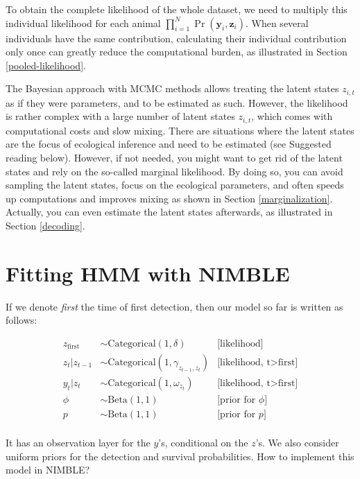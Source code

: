 \documentclass[
  12pt,
]{krantz}
\begin{document}
To obtain the complete likelihood of the whole dataset, we need to multiply this individual likelihood for each animal \(\displaystyle{\prod_{i=1}^N{\Pr(\mathbf{y}_i,\mathbf{z}_i)}}\). When several individuals have the same contribution, calculating their individual contribution only once can greatly reduce the computational burden, as illustrated in Section \ref{pooled-likelihood}.

The Bayesian approach with MCMC methods allows treating the latent states \(z_{i,t}\) as if they were parameters, and to be estimated as such. However, the likelihood is rather complex with a large number of latent states \(z_{i,t}\), which comes with computational costs and slow mixing. There are situations where the latent states are the focus of ecological inference and need to be estimated (see Suggested reading below). However, if not needed, you might want to get rid of the latent states and rely on the so-called marginal likelihood. By doing so, you can avoid sampling the latent states, focus on the ecological parameters, and often speeds up computations and improves mixing as shown in Section \ref{marginalization}. Actually, you can even estimate the latent states afterwards, as illustrated in Section \ref{decoding}.

\section{Fitting HMM with NIMBLE}\label{fittinghmmnimble}

If we denote \emph{first} the time of first detection, then our model so far is written as follows:

\begin{align*}
   z_{\text{first}} &\sim \text{Categorical}(1, \delta) &\text{[likelihood]}\\
   z_t | z_{t-1} &\sim \text{Categorical}(1, \gamma_{z_{t-1},z_{t}}) &\text{[likelihood, t>first]}\\
   y_t | z_{t} &\sim \text{Categorical}(1, \omega_{z_{t}}) &\text{[likelihood, t>first]}\\
  \phi &\sim \text{Beta}(1, 1) &\text{[prior for }\phi \text{]} \\
  p &\sim \text{Beta}(1, 1) &\text{[prior for }p \text{]} \\
\end{align*}

It has an observation layer for the \(y\)'s, conditional on the \(z\)'s. We also consider uniform priors for the detection and survival probabilities. How to implement this model in NIMBLE?
\end{document}
